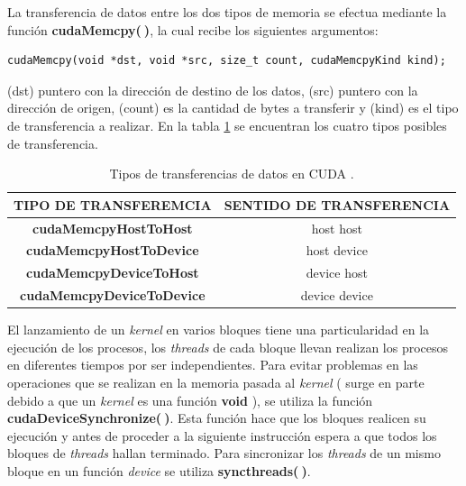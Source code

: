 La transferencia de datos entre los dos tipos de memoria se efectua mediante la función \textbf{cudaMemcpy($\>$)}, la cual recibe los siguientes argumentos:
{\footnotesize
\begin{frame}{}
	\begin{lstlisting}
cudaMemcpy(void *dst, void *src, size_t count, cudaMemcpyKind kind);
	\end{lstlisting}
	
\end{frame}
}
(dst) puntero con la dirección de destino de los datos, (src) puntero con la dirección de origen, (count) es la cantidad de bytes a transferir y (kind) es el tipo de transferencia a realizar\cite{zone2020cuda}. En la tabla \ref{tab:cudamemcy} se encuentran los cuatro tipos posibles de transferencia.

\begin{table}[h!]
	\centering
	\begin{tabular}{|c|c|}
		\hline
		\multicolumn{1}{|l|}{TIPO DE TRANSFEREMCIA} & \multicolumn{1}{l|}{SENTIDO DE TRANSFERENCIA} \\ \hline
		\textbf{cudaMemcpyHostToHost}               & host host                                     \\ \hline
		\textbf{cudaMemcpyHostToDevice}             & host device                                   \\ \hline
		\textbf{cudaMemcpyDeviceToHost}             & device host                                   \\ \hline
		\textbf{cudaMemcpyDeviceToDevice}           & device device                                 \\ \hline
	\end{tabular}
	\caption{Tipos de transferencias de datos en CUDA \cite{represa2016introduccion}.}
	\label{tab:cudamemcy}
\end{table}

El lanzamiento de un \textit{kernel} en varios bloques tiene una particularidad en la ejecución de los procesos, los \textit{threads} de cada bloque llevan realizan los procesos en diferentes tiempos por ser independientes. Para evitar problemas en las operaciones que se realizan en la memoria pasada al \textit{kernel} ( surge en parte debido a que un \textit{kernel} es una función \textbf{void} ), se utiliza la función \textbf{cudaDeviceSynchronize($\>$)}. Esta función hace que los bloques realicen su ejecución y antes de proceder a la siguiente instrucción espera a que todos los bloques de \textit{threads} hallan terminado. Para sincronizar los \textit{threads} de un mismo bloque en un función \textit{device} se utiliza \textbf{syncthreads($\>$)}.


